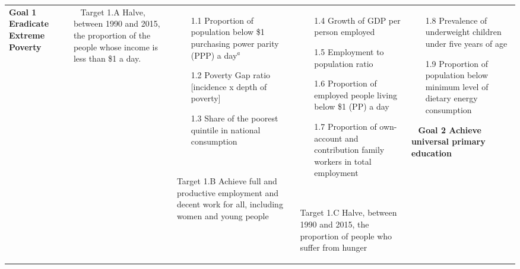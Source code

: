 \documentclass{article}
\begin{document}
\begin{center}
	\begin{tabularx}{\textwidth}[t]{XX}
		\hline
		\textbf{\textcolor{myGreen}{Goal 1 Eradicate Extreme Poverty}}                                                                                  & \    \hline
		Target 1.A Halve, between 1990 and 2015, the proportion of the people whose income is less than \$1 a day.                                      &
		\begin{minipage}[t]{\linewidth}%
			\begin{itemize}
				\item[1.1] Proportion of population below \$1 purchasing power parity (PPP) a day$^a$
				\item[1.2] Poverty Gap ratio [incidence x depth of poverty]
				\item[1.3] Share of the poorest quintile in national consumption
			\end{itemize}
		\end{minipage}\
		\hline

		Target 1.B Achieve full and productive employment and decent work for all, including women and young people                                     &
		\begin{minipage}[t]{\linewidth}%
			\begin{itemize}
				\item[1.4] Growth of GDP per person employed
				\item[1.5] Employment to population ratio
				\item[1.6] Proportion of employed people living below \$1 (PP) a day
				\item[1.7] Proportion of own-account and contribution family workers in total employment
			\end{itemize}
		\end{minipage}\
		\hline

		Target 1.C Halve, between 1990 and 2015, the proportion of people who suffer from hunger                                                        &
		\begin{minipage}[t]{\linewidth}%
			\begin{itemize}
				\item[1.8] Prevalence of underweight children under five years of age
				\item[1.9] Proportion of population below minimum level of dietary energy consumption
			\end{itemize}
		\end{minipage}\
		\arrayrulecolor{green}\hline
		\textbf{\textcolor{myGreen}{Goal 2 Achieve universal primary education}} \    \hline


\end{tabularx}
\end{center}
\end{document}
